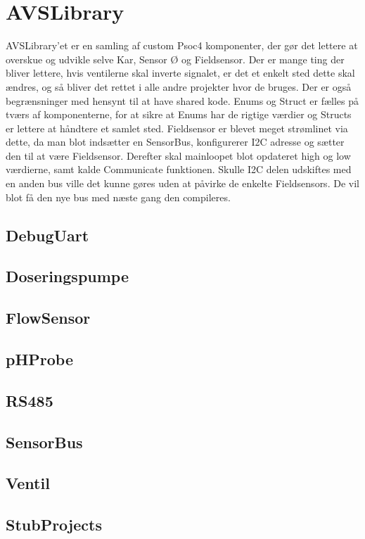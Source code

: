 \section{AVSLibrary}

AVSLibrary'et er en samling af custom Psoc4 komponenter, 
der gør det lettere at overskue og udvikle selve Kar, Sensor Ø og Fieldsensor. 
Der er mange ting der bliver lettere, hvis ventilerne skal inverte signalet, 
er det et enkelt sted dette skal ændres, og så bliver det rettet i alle andre 
projekter hvor de bruges. Der er også begrænsninger med hensynt til at have 
shared kode. Enums og Struct er fælles på tværs af komponenterne, for at 
sikre at Enums har de rigtige værdier og Structs er lettere at håndtere et 
samlet sted. Fieldsensor er blevet meget strømlinet via dette, da man 
blot indsætter en SensorBus, konfigurerer I2C adresse og sætter den til 
at være Fieldsensor. Derefter skal mainloopet blot opdateret high og low 
værdierne, samt kalde Communicate funktionen. Skulle I2C delen udskiftes 
med en anden bus ville det kunne gøres uden at påvirke de enkelte Fieldsensors. 
De vil blot få den nye bus med næste gang den compileres.

\subsection{DebugUart}


\subsection{Doseringspumpe}


\subsection{FlowSensor}


\subsection{pHProbe}


\subsection{RS485}


\subsection{SensorBus}


\subsection{Ventil}


\subsection{StubProjects}
